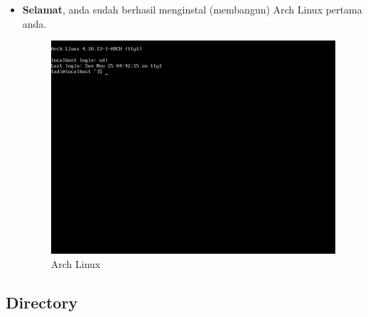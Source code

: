 \documentclass[12pt,]{article}
\begin{document}
\begin{itemize}
		\item \textbf{Selamat}, anda sudah berhasil menginstal (membangun) Arch Linux pertama anda.
		\begin{figure}[H]
			\centering
			\includegraphics[width=0.6\linewidth]{images/vbox_afterinstall/s5}
			\caption{Arch Linux}
		\end{figure}
	\end{itemize}

	\subsection{Directory}
\end{document}
